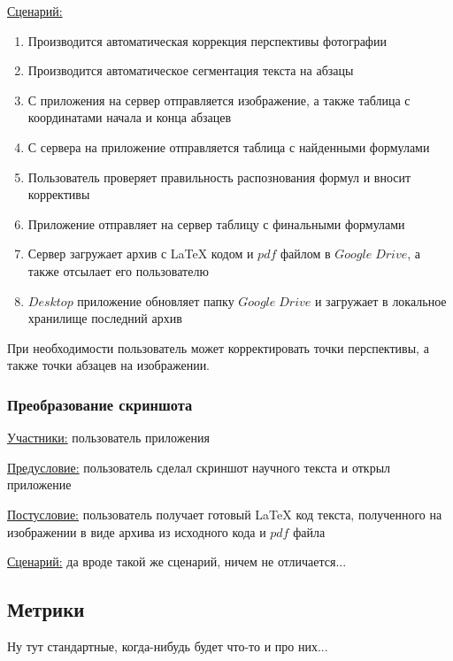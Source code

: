\underline{Сценарий:}
\begin{enumerate}
    \item Производится автоматическая коррекция перспективы фотографии
    \item Производится автоматическое сегментация текста на абзацы
    \item С приложения на сервер отправляется изображение, а также таблица с координатами начала и конца абзацев
    \item С сервера на приложение отправляется таблица с найденными формулами
    \item Пользователь проверяет правильность распознования формул и вносит коррективы
    \item Приложение отправляет на сервер таблицу с финальными формулами
    \item Сервер загружает архив с \LaTeX\; кодом и $pdf$ файлом в $Google\;Drive$, а также отсылает его пользователю
    \item $Desktop$ приложение обновляет папку $Google\;Drive$ и загружает в локальное хранилище последний архив
\end{enumerate}

При необходимости пользователь может корректировать точки перспективы, а также точки абзацев на изображении.

\subsubsection{Преобразование скриншота}
\underline{Участники:} пользователь приложения

\underline{Предусловие:} пользователь сделал скриншот научного текста и открыл приложение

\underline{Постусловие:} пользователь получает готовый \LaTeX\; код текста, полученного на изображении в виде архива из исходного кода и $pdf$ файла

\underline{Сценарий:} да вроде такой же сценарий, ничем не отличается...

\subsection{Метрики}
Ну тут стандартные, когда-нибудь будет что-то и про них...